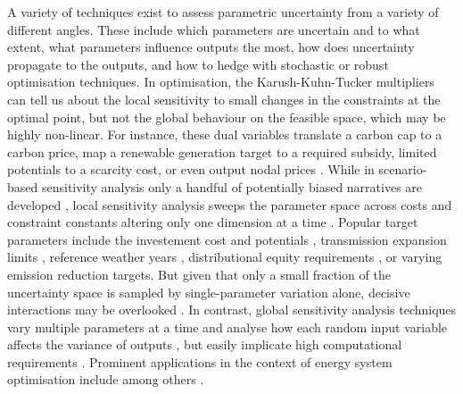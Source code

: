 A variety of techniques exist to assess parametric uncertainty
from a variety of different angles. These include
which parameters are uncertain and to what extent,
what parameters influence outputs the most,
how does uncertainty propagate to the outputs, and
how to hedge with stochastic or robust optimisation techniques.
In optimisation, the Karush-Kuhn-Tucker multipliers
can tell us about the local sensitivity to small changes in the constraints at the optimal point,
but not the global behaviour on the feasible space, which may be highly non-linear.
For instance, these dual variables translate a carbon cap to a carbon price, map a renewable generation target to a required subsidy, limited potentials to a scarcity cost, or even output nodal prices \cite{marketvalue}.
While in scenario-based sensitivity analysis only
a handful of potentially biased narratives are developed \cite{DeCarolis2017,soroudi_decision_2013,usher_value_2015}, local sensitivity analysis sweeps the parameter space
across costs and constraint constants altering only one dimension at a time \cite{schlachtberger_cost_2018}.
Popular target parameters include the investement cost and potentials \cite{schlachtberger_cost_2018},
transmission expansion limits \cite{schlachtberger_benefits_2017},
reference weather years \cite{bloomfield_2021},
distributional equity requirements \cite{sasse_regional_2020,sasse_distributional_2019},
or varying emission reduction targets.
But given that only a small fraction of the uncertainty space
is sampled by single-parameter variation alone,
decisive interactions may be overlooked \cite{pizarro-alonso_uncertainties_2019}.
In contrast, global sensitivity analysis techniques vary multiple parameters at a time
and analyse how each random input variable affects the variance of outputs \cite{sudret_global_2008},
but easily implicate high computational requirements \cite{usher_value_2015,pizarro-alonso_uncertainties_2019,moret_robust_2016}.
Prominent applications in the context of energy system optimisation include among others
\cite{trondle_trade-offs_2020,fais_impact_2016,mavromatidis_uncertainty_2018,pilpola_analyzing_2020}.


